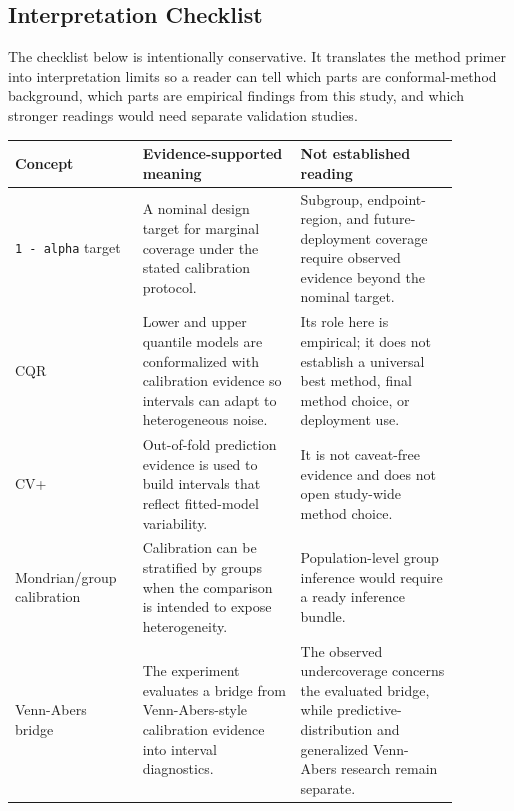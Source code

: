 \documentclass[11pt]{article}
\begin{document}
\subsection{Interpretation Checklist}

The checklist below is intentionally conservative. It translates the method primer into interpretation limits so a reader can tell which parts are conformal-method background, which parts are empirical findings from this study, and which stronger readings would need separate validation studies.

\begingroup
\footnotesize
\setlength{\tabcolsep}{2pt}
\renewcommand{\arraystretch}{1.18}
\begin{tabular}{@{}>{\RaggedRight\arraybackslash}p{0.240\linewidth}>{\RaggedRight\arraybackslash}p{0.320\linewidth}>{\RaggedRight\arraybackslash}p{0.320\linewidth}@{}}
\toprule
Concept & Evidence-supported meaning & Not established reading \\
\midrule
\texttt{1 - alpha} target & A nominal design target for marginal coverage under the stated calibration protocol. & Subgroup, endpoint-region, and future-deployment coverage require observed evidence beyond the nominal target. \\
CQR & Lower and upper quantile models are conformalized with calibration evidence so intervals can adapt to heterogeneous noise. & Its role here is empirical; it does not establish a universal best method, final method choice, or deployment use. \\
CV+ & Out-of-fold prediction evidence is used to build intervals that reflect fitted-model variability. & It is not caveat-free evidence and does not open study-wide method choice. \\
Mondrian/group calibration & Calibration can be stratified by groups when the comparison is intended to expose heterogeneity. & Population-level group inference would require a ready inference bundle. \\
Venn-Abers bridge & The experiment evaluates a bridge from Venn-Abers-style calibration evidence into interval diagnostics. & The observed undercoverage concerns the evaluated bridge, while predictive-distribution and generalized Venn-Abers research remain separate. \\
\bottomrule
\end{tabular}
\endgroup
\end{document}
